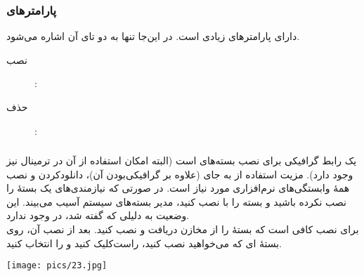 \subsubsection[پارامترهای dpkg]{پارامترهای }
 دارای پارامترهای زیادی است. در این‌جا تنها به دو تای آن اشاره می‌شود.

\begin{description}
\item[نصب]: 
\item[حذف]: 
\end{description}

\subsubsection[gdebi]{}
 یک رابط گرافیکی برای نصب بسته‌های  است (البته امکان استفاده از آن در ترمینال نیز وجود دارد). مزیت استفاده از  به جای  (علاوه بر گرافیکی‌بودن آن)، دانلودکردن و نصب همهٔ وابستگی‌های نرم‌افزاری مورد نیاز است. در صورتی که نیازمندی‌های یک بستهٔ  را نصب نکرده باشید و بسته را با  نصب کنید، مدیر بسته‌های سیستم آسیب می‌بیند. این وضعیت به دلیلی که گفته شد، در  وجود ندارد.\\
برای نصب  کافی است که بستهٔ  را از مخازن دریافت و نصب کنید. بعد از نصب آن، روی بستهٔ  ای که می‌خواهید نصب کنید، راست‌کلیک کنید و  را انتخاب کنید.

\begin{center}
\texttt{[image: pics/23.jpg]}
\end{center}
